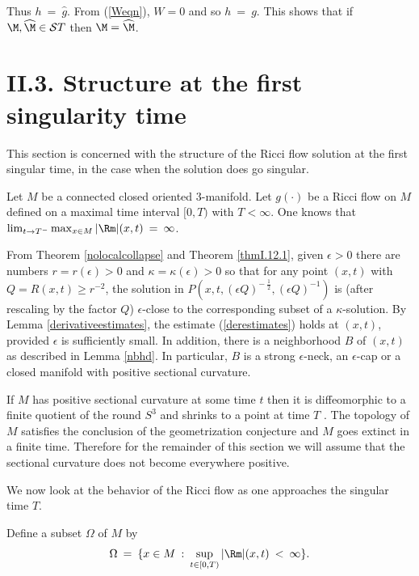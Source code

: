 Thus $h \: = \: \widehat{g}$. From (\ref{Weqn}), $W = 0$ and so
$h \: = \: g$. This shows that if $\M, \widehat{\M} \in
{\mathcal ST}$ then $\M = \widehat{\M}$.

\section{II.3. Structure at the first singularity time} \label{II.3}

This section is concerned with the structure of the Ricci flow solution at the
first singular time, in the case when the solution does go singular.

Let $M$ be a connected closed oriented $3$-manifold.  Let $g(\cdot)$ be a Ricci flow on
$M$ defined on a maximal time interval $[0,T)$ with $T < \infty$. One knows
that $\lim_{t \rightarrow T^-} \max_{x \in M} |\Rm|(x,t) \: = \: \infty$.

From Theorem \ref{nolocalcollapse} and Theorem \ref{thmI.12.1}, given
$\epsilon > 0$ there are numbers $r = r(\epsilon) > 0$ and
$\kappa = \kappa(\epsilon) > 0$ so that for any
point $(x,t)$ with $Q = R(x,t)  \ge r^{-2}$, the solution in
$P(x,t, (\epsilon Q)^{- \: \frac12}, (\epsilon Q)^{- 1})$ is (after rescaling
by the factor $Q$) $\epsilon$-close
to the corresponding subset of a $\kappa$-solution. By Lemma
\ref{derivativeestimates}, the estimate (\ref{derestimates})
holds at $(x,t)$,
provided $\epsilon$ is sufficiently small. In addition,
there is a neighborhood $B$ of $(x,t)$
as described in Lemma  \ref{nbhd}.  In particular, $B$ is a strong $\epsilon$-neck,
an $\epsilon$-cap or a closed manifold with positive sectional curvature.

If $M$ has positive sectional curvature at some time $t$ then it
is diffeomorphic
to a finite quotient of the round $S^3$ and shrinks to a point at time
$T$ \cite{Hamiltonnnnn}.
The topology of $M$ satisfies the conclusion of the geometrization
conjecture and $M$ goes extinct in a finite time. Therefore
for the remainder of this section we will assume that the sectional curvature
does not become everywhere positive.

We now look at the behavior of the Ricci flow as one approaches the
singular time $T$.

\begin{definition}
  \label{def:kl-structure-at-first-singularity-time-bounded-curvature-regular-set}

Define a subset $\Omega$ of $M$ by
\begin{equation}
\Omega \: = \: \{x \in M \: : \: \sup_{t \in [0,T)} |\Rm|(x,t) \: < \: \infty \}.
\end{equation}
\end{definition}

